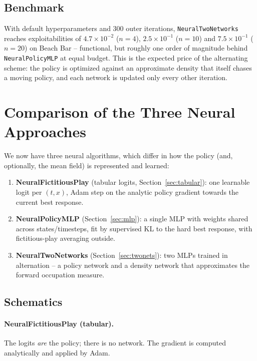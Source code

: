 \documentclass[11pt,a4paper]{article}
\begin{document}
\subsection{Benchmark}
With default hyperparameters and 300 outer iterations,
\texttt{NeuralTwoNetworks} reaches exploitabilities of $4.7 \times 10^{-2}$
($n{=}4$), $2.5 \times 10^{-1}$ ($n{=}10$) and $7.5 \times 10^{-1}$
($n{=}20$) on Beach Bar -- functional, but roughly one order of magnitude
behind \texttt{NeuralPolicyMLP} at equal budget. This is the expected price
of the alternating scheme: the policy is optimized against an approximate
density that itself chases a moving policy, and each network is updated only
every other iteration.

\section{Comparison of the Three Neural Approaches}\label{sec:compare}

We now have three neural algorithms, which differ in how the policy (and,
optionally, the mean field) is represented and learned:

\begin{enumerate}
  \item \textbf{NeuralFictitiousPlay} (tabular logits, Section~\ref{sec:tabular}):
        one learnable logit per $(t, x)$, Adam step on the analytic policy
        gradient towards the current best response.
  \item \textbf{NeuralPolicyMLP} (Section~\ref{sec:mlp}): a single MLP with
        weights shared across states/timesteps, fit by supervised KL to the
        hard best response, with fictitious-play averaging outside.
  \item \textbf{NeuralTwoNetworks} (Section~\ref{sec:twonets}): two MLPs trained
        in alternation -- a policy network and a density network that
        approximates the forward occupation measure.
\end{enumerate}

\subsection{Schematics}

\paragraph{NeuralFictitiousPlay (tabular).} The logits \emph{are} the policy;
there is no network. The gradient is computed analytically and applied by Adam.
\end{document}
